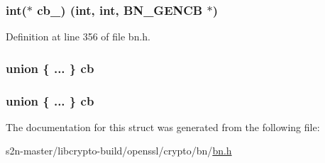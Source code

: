 \subsubsection[{\texorpdfstring{cb\+\_\+2}{cb_2}}]{\setlength{\rightskip}{0pt plus 5cm}int($\ast$ cb\+\_) (int, int, {\bf B\+N\+\_\+\+G\+E\+N\+CB} $\ast$)}\hypertarget{structbn__gencb__st_afa25214ca7d6721c7c6f449d564adf73}{}\label{structbn__gencb__st_afa25214ca7d6721c7c6f449d564adf73}


Definition at line 356 of file bn.\+h.

\subsubsection[{\texorpdfstring{cb}{cb}}]{\setlength{\rightskip}{0pt plus 5cm}union \{ ... \}   cb}\hypertarget{structbn__gencb__st_ae9defd028d3c66dbbe071526ab06937e}{}\label{structbn__gencb__st_ae9defd028d3c66dbbe071526ab06937e}
\subsubsection[{\texorpdfstring{cb}{cb}}]{\setlength{\rightskip}{0pt plus 5cm}union \{ ... \}   cb}\hypertarget{structbn__gencb__st_afce0375516e5e19134a224446c751f15}{}\label{structbn__gencb__st_afce0375516e5e19134a224446c751f15}


The documentation for this struct was generated from the following file\+:\begin{DoxyCompactItemize}
\item 
s2n-\/master/libcrypto-\/build/openssl/crypto/bn/\hyperlink{crypto_2bn_2bn_8h}{bn.\+h}\end{DoxyCompactItemize}
